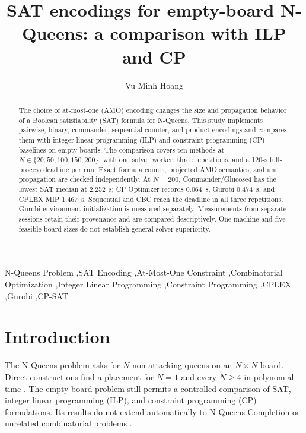 \documentclass[a4paper,fleqn]{cas-sc}
\begin{document}
\title[mode=title]{SAT encodings for empty-board N-Queens: a comparison with ILP and CP}

\author[1]{Vu Minh Hoang}
\cormark[1]

\address[1]{VNU University of Engineering and Technology, Hanoi, Vietnam}


\begin{abstract}
The choice of at-most-one (AMO) encoding changes the size and propagation behavior of a Boolean satisfiability (SAT) formula for N-Queens. This study implements pairwise, binary, commander, sequential counter, and product encodings and compares them with integer linear programming (ILP) and constraint programming (CP) baselines on empty boards. The comparison covers ten methods at $N\in\{20,50,100,150,200\}$, with one solver worker, three repetitions, and a 120-s full-process deadline per run. Exact formula counts, projected AMO semantics, and unit propagation are checked independently. At $N=200$, Commander/Glucose4 has the lowest SAT median at 2.252~s; CP Optimizer records 0.064~s, Gurobi 0.474~s, and CPLEX MIP 1.467~s. Sequential and CBC reach the deadline in all three repetitions. Gurobi environment initialization is measured separately. Measurements from separate sessions retain their provenance and are compared descriptively. One machine and five feasible board sizes do not establish general solver superiority.
\end{abstract}

\begin{keywords}
N-Queens Problem \sep SAT Encoding \sep At-Most-One Constraint \sep Combinatorial Optimization \sep Integer Linear Programming \sep Constraint Programming \sep CPLEX \sep Gurobi \sep CP-SAT
\end{keywords}

\maketitle
{}

\section{Introduction}

The N-Queens problem asks for $N$ non-attacking queens on an $N\times N$ board. Direct constructions find a placement for $N=1$ and every $N\geq4$ in polynomial time \cite{bell2009survey}. The empty-board problem still permits a controlled comparison of SAT, integer linear programming (ILP), and constraint programming (CP) formulations. Its results do not extend automatically to N-Queens Completion or unrelated combinatorial problems \cite{gent2017complexity}.
\end{document}
